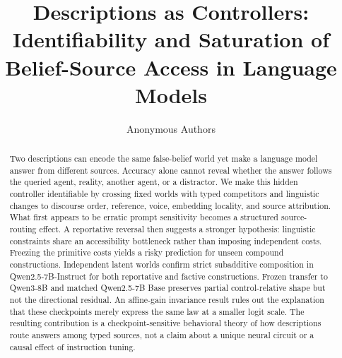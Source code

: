 \documentclass{article}
\title{Descriptions as Controllers: Identifiability and Saturation of Belief-Source Access in Language Models}
\author{Anonymous Authors}
\begin{document}
\maketitle

\begin{abstract}
Two descriptions can encode the same false-belief world yet make a language
model answer from different sources. Accuracy alone cannot reveal whether the
answer follows the queried agent, reality, another agent, or a distractor. We
make this hidden controller identifiable by crossing fixed worlds with typed
competitors and linguistic changes to discourse order, reference, voice,
embedding locality, and source attribution. What first appears to be erratic
prompt sensitivity becomes a structured source-routing effect. A reportative
reversal then suggests a stronger hypothesis: linguistic constraints share an
accessibility bottleneck rather than imposing independent costs. Freezing the
primitive costs yields a risky prediction for unseen compound constructions.
Independent latent worlds confirm strict subadditive composition in
Qwen2.5-7B-Instruct for both reportative and factive constructions. Frozen
transfer to Qwen3-8B and matched Qwen2.5-7B Base preserves partial
control-relative shape but not the directional residual. An affine-gain
invariance result rules out the explanation that these checkpoints merely
express the same law at a smaller logit scale. The resulting contribution is a
checkpoint-sensitive behavioral theory of how descriptions route answers among
typed sources, not a claim about a unique neural circuit or a causal effect of
instruction tuning.
\end{abstract}










\appendix


\newpage

\end{document}
